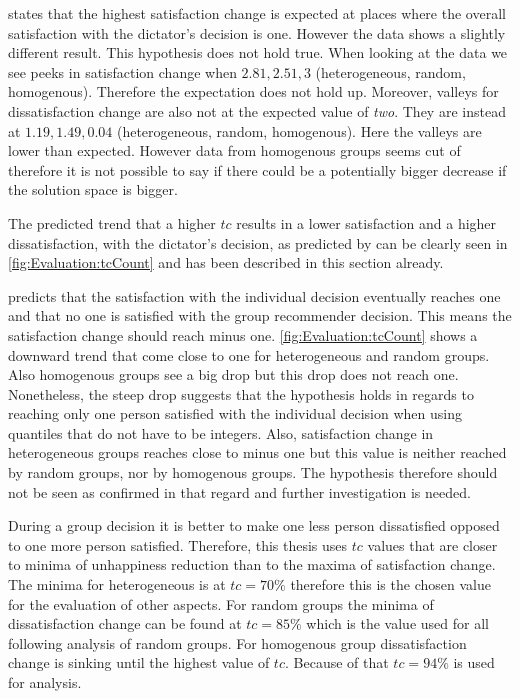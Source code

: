  states that the highest satisfaction change is expected at places where the overall satisfaction with the dictator's decision is one. However the data shows a slightly different result. This hypothesis does not hold true. When looking at the data we see peeks in satisfaction change when $2.81, 2.51, 3$ (heterogeneous, random, homogenous). Therefore the expectation does not hold up. Moreover, valleys for dissatisfaction change are also not at the expected value of \textit{two}. They are instead at $1.19, 1.49, 0.04$ (heterogeneous, random, homogenous). Here the valleys are lower than expected. However data from homogenous groups seems cut of therefore it is not possible to say if there could be a potentially bigger decrease if the solution space is bigger.

The predicted trend that a higher $tc$ results in a lower satisfaction and a higher dissatisfaction, with the dictator's decision, as predicted by  can be clearly seen in \autoref{fig:Evaluation:tcCount} and has been described in this section already.

 predicts that the satisfaction with the individual decision eventually reaches one and that no one is satisfied with the group recommender decision. This means the satisfaction change should reach minus one. \autoref{fig:Evaluation:tcCount} shows a downward trend that come close to one for heterogeneous and random groups. Also homogenous groups see a big drop but this drop does not reach one. Nonetheless, the steep drop suggests that the hypothesis holds in regards to reaching only one person satisfied with the individual decision when using quantiles that do not have to be integers. Also, satisfaction change in heterogeneous groups reaches close to minus one but this value is neither reached by random groups, nor by homogenous groups. The hypothesis therefore should not be seen as confirmed in that regard and further investigation is needed.

During a group decision it is better to make one less person dissatisfied opposed to one more person satisfied. Therefore, this thesis uses $tc$ values that are closer to minima of unhappiness reduction than to the maxima of satisfaction change. The minima for heterogeneous is at $tc = 70\%$ therefore this is the chosen value for the evaluation of other aspects. For random groups the minima of dissatisfaction change can be found at $tc = 85\%$ which is the value used for all following analysis of random groups. For homogenous group dissatisfaction change is sinking until the highest value of $tc$. Because of that $tc = 94\%$ is used for analysis.

